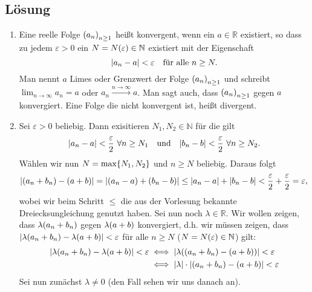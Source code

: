 \documentclass[german,12pt]{homework}
\newcommand{\NN}{\mathbb{N}}
\newcommand{\RR}{\mathbb{R}}
\DeclarePairedDelimiter{\absolute}{\lvert}{\rvert}
\DeclarePairedDelimiter{\enbrace}{(}{)}
\DeclarePairedDelimiter{\penbrace}{\{}{\}}
\begin{document}
    \subsection*{Lösung}
    \begin{enumerate}
        \item Eine reelle Folge \(\enbrace*{a_n}_{n \ge 1}\) heißt konvergent,
        wenn ein \(a \in \RR\) existiert, so dass zu jedem \(\varepsilon > 0\)
        ein \(N = N\enbrace*{\varepsilon} \in \NN\) existiert mit der
        Eigenschaft
        \[\absolute*{a_n - a} < \varepsilon \quad \text{für alle }n \ge N.\]
        Man nennt \(a\) Limes oder Grenzwert der Folge \(\enbrace*{a_n}_{n \ge
        1}\) und schreibt \(\lim_{n \to \infty}a_n = a\) oder \(a_n
        \xrightarrow{n \to \infty} a\). Man sagt auch, dass \(\enbrace*{a_n}_{n
        \ge 1}\) gegen \(a\) konvergiert. Eine Folge die nicht konvergent ist,
        heißt divergent.
        \item Sei \(\varepsilon > 0\) beliebig. Dann exisitieren \(N_1, N_2 \in
        \NN\) für die gilt
        \[\absolute*{a_n - a} < \frac{\varepsilon}{2}\ \forall{n \ge N_1} \quad
        \text{und} \quad \absolute*{b_n - b} < \frac{\varepsilon}{2}\ \forall{n
        \ge N_2}.\]
        Wählen wir nun \(N = \max\penbrace*{N_1, N_2}\) und \(n \ge N\)
        beliebig. Daraus folgt
        \[\absolute*{\enbrace*{a_n + b_n} - \enbrace*{a + b}} =
        \absolute*{\enbrace*{a_n - a} + \enbrace*{b_n - b}} \le \absolute*{a_n
        - a} + \absolute*{b_n - b} < \frac{\varepsilon}{2} +
        \frac{\varepsilon}{2} = \varepsilon,\]
        wobei wir beim Schritt \(\le\) die aus der Vorlesung bekannte
        Dreiecksungleichung genutzt haben. Sei nun noch \(\lambda \in \RR\).
        Wir wollen zeigen, dass \(\lambda\enbrace*{a_n + b_n}\) gegen
        \(\lambda\enbrace*{a + b}\) konvergiert, d.h. wir müssen zeigen, dass
        \(\absolute*{\lambda\enbrace*{a_n + b_n} - \lambda\enbrace*{a + b}} <
        \varepsilon\) für alle \(n \ge N\) (\(N = N\enbrace*{\varepsilon} \in
        \NN\)) gilt:
        \begin{align*}
            \absolute*{\lambda\enbrace*{a_n + b_n} - \lambda\enbrace*{a + b}} <
            \varepsilon &\iff \absolute*{\lambda\enbrace*{\enbrace*{a_n + b_n}
            - \enbrace*{a + b}}} < \varepsilon\\
            &\iff \absolute*{\lambda} \cdot \absolute*{\enbrace*{a_n + b_n} -
            \enbrace*{a + b}} < \varepsilon
        \end{align*}
        Sei nun zunächst \(\lambda \ne 0\) (den Fall sehen wir uns danach an).

\end{enumerate}
\end{document}

